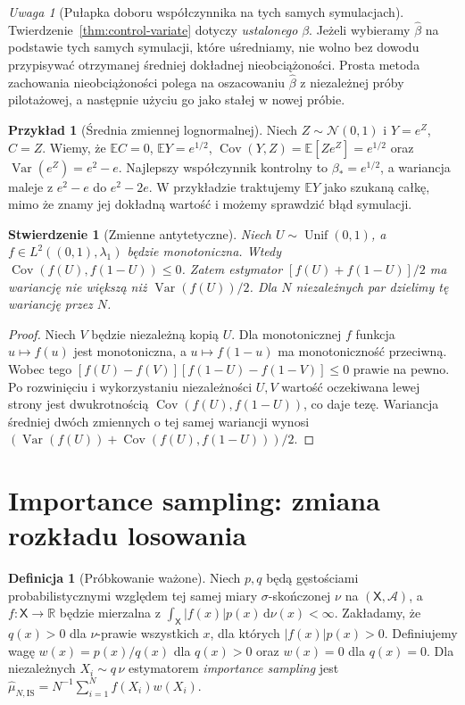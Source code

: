 \documentclass[11pt,a4paper,oneside]{report}
\numberwithin{equation}{chapter}
\theoremstyle{plain}
\newtheorem{stwierdzenie}[twierdzenie]{Stwierdzenie}
\theoremstyle{definition}
\newtheorem{definicja}{Definicja}[chapter]
\newtheorem{przyklad}{Przykład}[chapter]
\theoremstyle{remark}
\newtheorem{uwaga}{Uwaga}[chapter]
\newcommand{\R}{\mathbb R}
\newcommand{\E}{\mathbb E}
\newcommand{\Var}{\operatorname{Var}}
\newcommand{\Cov}{\operatorname{Cov}}
\newcommand{\dd}{\mathrm d}
\newcommand{\Normal}{\mathcal N}
\begin{document}
\begin{uwaga}[Pułapka doboru współczynnika na tych samych symulacjach]
Twierdzenie~\ref{thm:control-variate} dotyczy \emph{ustalonego}
$\beta$. Jeżeli wybieramy $\widehat\beta$ na podstawie tych
samych symulacji, które uśredniamy, nie wolno bez dowodu
przypisywać otrzymanej średniej dokładnej nieobciążoności.
Prosta metoda zachowania nieobciążoności polega na oszacowaniu
$\widehat\beta$ z niezależnej próby pilotażowej, a następnie
użyciu go jako stałej w nowej próbie.
\end{uwaga}

\begin{przyklad}[Średnia zmiennej lognormalnej]
Niech $Z\sim\Normal(0,1)$ i
$Y=e^Z$, $C=Z$. Wiemy, że $\E C=0$,
$\E Y=e^{1/2}$, $\Cov(Y,Z)=\E[Ze^Z]=e^{1/2}$
oraz $\Var(e^Z)=e^2-e$.
Najlepszy współczynnik kontrolny to $\beta_*=e^{1/2}$,
a wariancja maleje z $e^2-e$ do $e^2-2e$.
W przykładzie traktujemy $\E Y$ jako szukaną całkę,
mimo że znamy jej dokładną wartość i możemy sprawdzić błąd symulacji.
\end{przyklad}

\begin{stwierdzenie}[Zmienne antytetyczne]
\label{prop:antithetic}
Niech $U\sim\operatorname{Unif}(0,1)$, a
$f\in L^2((0,1),\lambda_1)$ będzie monotoniczna.
Wtedy $\Cov(f(U),f(1-U))\le0$.
Zatem estymator $[f(U)+f(1-U)]/2$ ma wariancję
nie większą niż $\Var(f(U))/2$.
Dla $N$ niezależnych par dzielimy tę wariancję przez $N$.
\end{stwierdzenie}
\begin{proof}
Niech $V$ będzie niezależną kopią $U$. Dla monotonicznej
$f$ funkcja $u\mapsto f(u)$ jest monotoniczna, a
$u\mapsto f(1-u)$ ma monotoniczność przeciwną.
Wobec tego
$[f(U)-f(V)][f(1-U)-f(1-V)]\le0$ prawie na pewno.
Po rozwinięciu i wykorzystaniu niezależności $U,V$
wartość oczekiwana lewej strony jest dwukrotnością
$\Cov(f(U),f(1-U))$, co daje tezę.
Wariancja średniej dwóch zmiennych o tej samej wariancji
wynosi $(\Var(f(U))+\Cov(f(U),f(1-U)))/2$.
\end{proof}

\section{Importance sampling: zmiana rozkładu losowania}
\begin{definicja}[Próbkowanie ważone]
\label{def:importance-sampling}
Niech $p,q$ będą gęstościami probabilistycznymi względem
tej samej miary $\sigma$-skończonej $\nu$ na $(\mathsf X,\mathcal A)$,
a $f\colon\mathsf X\to\R$ będzie mierzalna z
$\int_{\mathsf X}|f(x)|p(x)\,\dd\nu(x)<\infty$.
Zakładamy, że $q(x)>0$ dla $\nu$-prawie wszystkich $x$,
dla których $|f(x)|p(x)>0$. Definiujemy wagę
$w(x)=p(x)/q(x)$ dla $q(x)>0$ oraz $w(x)=0$ dla $q(x)=0$.
Dla niezależnych $X_i\sim q\,\nu$ estymatorem \emph{importance sampling}
jest $\widehat\mu_{N,\mathrm{IS}}=N^{-1}\sum_{i=1}^N f(X_i)w(X_i)$.
\end{definicja}
\end{document}
